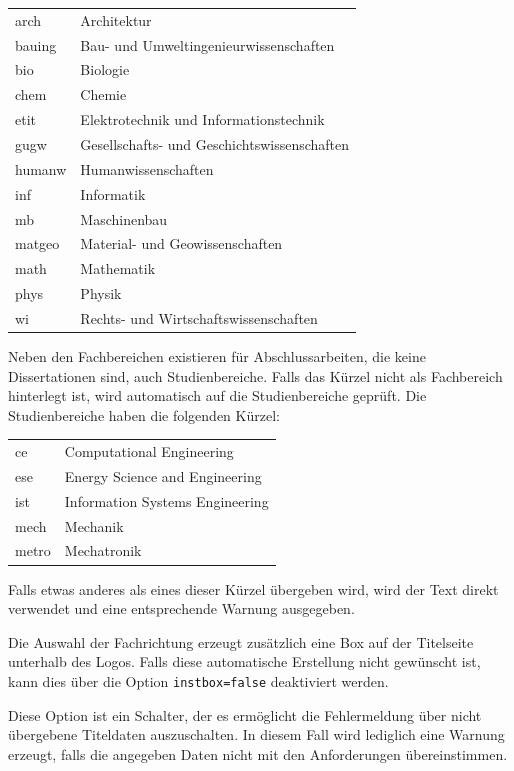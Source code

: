\documentclass[
	german,%
	accentcolor=9c,%
	ruledheaders=section,%
	class=report,%
	thesis={type=bachelor},%
	fontsize=11pt,%
	parskip=half-,%
	custommargins=true,%
	marginpar=false,%
]{tudapub}
\newcommand*{\code}[1]{\texttt{#1}}
\begin{document}
\begin{description}
	      \begin{tabular}{@{}l@{${}\to{}$}l@{}}
		      arch  & Architektur\\
		      bauing& Bau- und Umweltingenieurwissenschaften\\
		      bio   &Biologie\\
		      chem  &Chemie\\
		      etit  &Elektrotechnik und Informationstechnik\\
		      gugw  &Gesellschafts- und Geschichtswissenschaften\\
		      humanw&Humanwissenschaften\\
		      inf   &Informatik\\
		      mb    &Maschinenbau\\
		      matgeo&Material- und Geowissenschaften\\
		      math  &Mathematik\\
		      phys  &Physik\\
		      wi    &Rechts- und Wirtschaftswissenschaften
	      \end{tabular}

	      Neben den Fachbereichen existieren für Abschlussarbeiten, die keine Dissertationen sind, auch Studienbereiche.
	      Falls das Kürzel nicht als Fachbereich hinterlegt ist, wird automatisch auf die Studienbereiche geprüft. Die Studienbereiche haben die folgenden Kürzel:

	      \begin{tabular}{@{}l@{${}\to{}$}l@{}}
		      ce&Computational Engineering\\
		      ese&Energy Science and Engineering\\
		      ist&Information Systems Engineering\\
		      mech&Mechanik\\
		      metro&Mechatronik
	      \end{tabular}

	      Falls etwas anderes als eines dieser Kürzel übergeben wird, wird der Text direkt verwendet und eine entsprechende Warnung ausgegeben.

	      Die Auswahl der Fachrichtung erzeugt zusätzlich eine Box auf der Titelseite unterhalb des Logos. Falls diese automatische Erstellung nicht gewünscht ist, kann dies über die Option \code{instbox=false} deaktiviert werden.
	\item[ignore-missing-data] Diese Option ist ein Schalter, der es ermöglicht die Fehlermeldung über nicht übergebene Titeldaten auszuschalten. In diesem Fall wird lediglich eine Warnung erzeugt, falls die angegeben Daten nicht mit den Anforderungen übereinstimmen.
\end{description}
\end{document}
